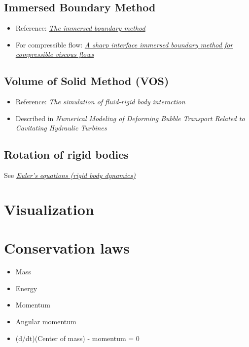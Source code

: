 \section{Immersed Boundary Method}

\begin{itemize}
    \item Reference: \textit{\href{http://www4.ncsu.edu/~zhilin/TEACHING/MA798Z/Peskin1.pdf}{The immersed boundary method}}
    \item For compressible flow: \textit{\href{http://www.cecs.wright.edu/~haibo.dong/wp-content/themes/publications/IBM_JCP_2007.pdf}{A sharp interface immersed boundary method for compressible viscous flows}}
\end{itemize}

\section{Volume of Solid Method (VOS)}

\begin{itemize}
    \item Reference: \textit{The simulation of fluid-rigid body interaction}
    \item Described in \textit{Numerical Modeling of Deforming Bubble Transport Related to Cavitating Hydraulic Turbines}
\end{itemize}

\section{Rotation of rigid bodies}

See \textit{\href{http://en.wikipedia.org/wiki/Euler\%27s_equations_\%28rigid_body_dynamics\%29}{Euler's equations (rigid body dynamics)}}

\chapter{Visualization}

\chapter{Conservation laws}

\begin{itemize}
    \item Mass
    \item Energy
    \item Momentum
    \item Angular momentum
    \item (d/dt)(Center of mass) - momentum = 0
\end{itemize}